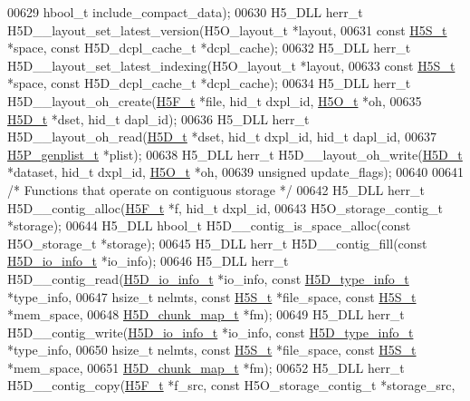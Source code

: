 \begin{DoxyCode}
00629     hbool\_t include\_compact\_data);
00630 H5\_DLL herr\_t H5D\_\_layout\_set\_latest\_version(H5O\_layout\_t *layout,
00631     \textcolor{keyword}{const} \hyperlink{struct_h5_s__t}{H5S\_t} *space, \textcolor{keyword}{const} H5D\_dcpl\_cache\_t *dcpl\_cache);
00632 H5\_DLL herr\_t H5D\_\_layout\_set\_latest\_indexing(H5O\_layout\_t *layout,
00633     \textcolor{keyword}{const} \hyperlink{struct_h5_s__t}{H5S\_t} *space, \textcolor{keyword}{const} H5D\_dcpl\_cache\_t *dcpl\_cache);
00634 H5\_DLL herr\_t H5D\_\_layout\_oh\_create(\hyperlink{struct_h5_f__t}{H5F\_t} *file, hid\_t dxpl\_id, \hyperlink{struct_h5_o__t}{H5O\_t} *oh,
00635     \hyperlink{struct_h5_d__t}{H5D\_t} *dset, hid\_t dapl\_id);
00636 H5\_DLL herr\_t H5D\_\_layout\_oh\_read(\hyperlink{struct_h5_d__t}{H5D\_t} *dset, hid\_t dxpl\_id, hid\_t dapl\_id,
00637     \hyperlink{struct_h5_p__genplist__t}{H5P\_genplist\_t} *plist);
00638 H5\_DLL herr\_t H5D\_\_layout\_oh\_write(\hyperlink{struct_h5_d__t}{H5D\_t} *dataset, hid\_t dxpl\_id, \hyperlink{struct_h5_o__t}{H5O\_t} *oh,
00639     \textcolor{keywordtype}{unsigned} update\_flags);
00640 
00641 \textcolor{comment}{/* Functions that operate on contiguous storage */}
00642 H5\_DLL herr\_t H5D\_\_contig\_alloc(\hyperlink{struct_h5_f__t}{H5F\_t} *f, hid\_t dxpl\_id,
00643     H5O\_storage\_contig\_t *storage);
00644 H5\_DLL hbool\_t H5D\_\_contig\_is\_space\_alloc(\textcolor{keyword}{const} H5O\_storage\_t *storage);
00645 H5\_DLL herr\_t H5D\_\_contig\_fill(\textcolor{keyword}{const} \hyperlink{struct_h5_d__io__info__t}{H5D\_io\_info\_t} *io\_info);
00646 H5\_DLL herr\_t H5D\_\_contig\_read(\hyperlink{struct_h5_d__io__info__t}{H5D\_io\_info\_t} *io\_info, \textcolor{keyword}{const} 
      \hyperlink{struct_h5_d__type__info__t}{H5D\_type\_info\_t} *type\_info,
00647     hsize\_t nelmts, \textcolor{keyword}{const} \hyperlink{struct_h5_s__t}{H5S\_t} *file\_space, \textcolor{keyword}{const} \hyperlink{struct_h5_s__t}{H5S\_t} *mem\_space,
00648     \hyperlink{struct_h5_d__chunk__map__t}{H5D\_chunk\_map\_t} *fm);
00649 H5\_DLL herr\_t H5D\_\_contig\_write(\hyperlink{struct_h5_d__io__info__t}{H5D\_io\_info\_t} *io\_info, \textcolor{keyword}{const} 
      \hyperlink{struct_h5_d__type__info__t}{H5D\_type\_info\_t} *type\_info,
00650     hsize\_t nelmts, \textcolor{keyword}{const} \hyperlink{struct_h5_s__t}{H5S\_t} *file\_space, \textcolor{keyword}{const} \hyperlink{struct_h5_s__t}{H5S\_t} *mem\_space,
00651     \hyperlink{struct_h5_d__chunk__map__t}{H5D\_chunk\_map\_t} *fm);
00652 H5\_DLL herr\_t H5D\_\_contig\_copy(\hyperlink{struct_h5_f__t}{H5F\_t} *f\_src, \textcolor{keyword}{const} H5O\_storage\_contig\_t *storage\_src,

\end{DoxyCode}
